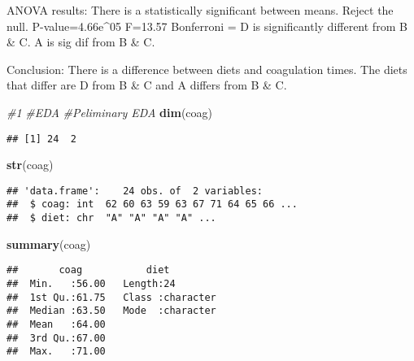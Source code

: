 \documentclass[
]{article}
\newenvironment{Shaded}{\begin{snugshade}}{\end{snugshade}}
\newcommand{\CommentTok}[1]{\textcolor[rgb]{0.56,0.35,0.01}{\textit{#1}}}
\newcommand{\FunctionTok}[1]{\textcolor[rgb]{0.13,0.29,0.53}{\textbf{#1}}}
\newcommand{\NormalTok}[1]{#1}
\newcommand{\SpecialCharTok}[1]{\textcolor[rgb]{0.81,0.36,0.00}{\textbf{#1}}}
\begin{document}
ANOVA results: There is a statistically significant between means.
Reject the null. P-value=4.66e\^{}05 F=13.57 Bonferroni = D is
significantly different from B \& C. A is sig dif from B \& C.

Conclusion: There is a difference between diets and coagulation times.
The diets that differ are D from B \& C and A differs from B \& C.

\begin{Shaded}
\begin{Highlighting}[]
\CommentTok{\#1}
\CommentTok{\#EDA}
\CommentTok{\#Peliminary EDA}
    \FunctionTok{dim}\NormalTok{(coag)}
\end{Highlighting}
\end{Shaded}

\begin{verbatim}
## [1] 24  2
\end{verbatim}

\begin{Shaded}
\begin{Highlighting}[]
    \FunctionTok{str}\NormalTok{(coag)}
\end{Highlighting}
\end{Shaded}

\begin{verbatim}
## 'data.frame':    24 obs. of  2 variables:
##  $ coag: int  62 60 63 59 63 67 71 64 65 66 ...
##  $ diet: chr  "A" "A" "A" "A" ...
\end{verbatim}

\begin{Shaded}
\begin{Highlighting}[]
    \FunctionTok{summary}\NormalTok{(coag)}
\end{Highlighting}
\end{Shaded}

\begin{verbatim}
##       coag           diet          
##  Min.   :56.00   Length:24         
##  1st Qu.:61.75   Class :character  
##  Median :63.50   Mode  :character  
##  Mean   :64.00                     
##  3rd Qu.:67.00                     
##  Max.   :71.00
\end{verbatim}

\begin{Shaded}
\end{Shaded}
\end{document}
